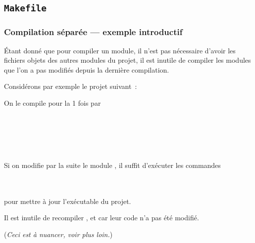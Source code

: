 \subsection{{\tt Makefile}}

\begin{frame}[fragile]
\frametitle{Compilation séparée --- exemple introductif}
Étant donné que pour compiler un module, il n'est pas nécessaire
d'avoir les fichiers objets des autres modules du projet, il est
\alert{inutile de compiler} les modules que l'on a \alert{pas modifiés}
depuis la dernière compilation.
\medskip

Considérons par exemple le projet suivant~:
\begin{multicols}{2}
\begin{center}
\end{center}
On le compile pour la 1\iere{} fois par \\
\begin{footnotesize}
     \\
     \\
     \\
     \\
\end{footnotesize}
\end{multicols}
\medskip

Si on modifie par la suite le module , il suffit d'exécuter les commandes
\begin{multicols}{2}
     \\
     \\
    pour mettre à jour l'exécutable du projet.
\end{multicols}
\medskip

Il est inutile de recompiler ,  et 
car leur code n'a pas été modifié.
\smallskip

({\it Ceci est à nuancer, voir plus loin.})
\end{frame}

